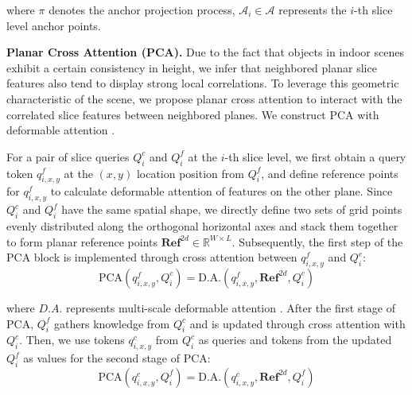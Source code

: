 \documentclass[letterpaper, 10 pt, conference]{ieeeconf}  %
\begin{document}
\noindent where $\pi$ denotes the anchor projection process, $\mathcal{A}_{i} \in \mathcal{A}$ represents the $i$-th slice level anchor points.

\textbf{Planar Cross Attention (PCA).} Due to the fact that objects in indoor scenes exhibit a certain consistency in height, we infer that neighbored planar slice features also tend to display strong local correlations. To leverage this geometric characteristic of the scene, we propose planar cross attention to interact with the correlated slice features between neighbored planes. We construct PCA with deformable attention \cite{zhu2020deformable}.


For a pair of slice queries $Q^c_i$ and $Q^f_i$ at the $i$-th slice level, we first obtain a query token $q^{f}_{i,x,y}$ at the $(x,y)$ location position from $Q^f_i$, and define reference points for  $q^{f}_{i,x,y}$ to calculate deformable attention of features on the other plane. Since 
$Q^c_i$ and $Q^f_i$ have the same spatial shape, we directly define two sets of grid points evenly distributed along the orthogonal horizontal axes and stack them together to form planar reference points  $\mathbf{Ref}^{2d} \in \mathbb{R}^{W\times L}$. Subsequently, the first step of the PCA block is implemented through cross attention between $q^{f}_{i,x,y}$ and $Q^c_i$:
\vspace{-5pt}
\begin{equation}
    \text{PCA}(q^f_{i,x,y},Q_i^c) =   \text{D.A.}(q^f_{i,x,y}, \mathbf{Ref}^{2d}, Q_i^c)
\end{equation}

\noindent where $D.A.$ represents multi-scale deformable attention \cite{zhu2020deformable}. After the first stage of PCA, $Q^f_i$ gathers knowledge from $Q^c_i$ and is updated through cross attention with $Q^c_i$. Then, we use tokens $q^c_{i,x,y}$ from $Q^c_i$ as queries and tokens from the updated $Q^f_i$ as values for the second stage of PCA:
\vspace{-4pt}
\begin{equation}
    \text{PCA}(q^c_{i,x,y},Q_i^f) = \text{D.A.}(q^c_{i,x,y}, \mathbf{Ref}^{2d}, Q_i^f)
\end{equation}
\end{document}
